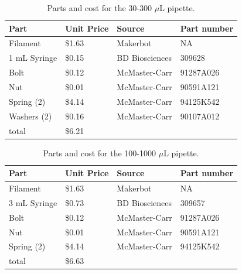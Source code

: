 \documentclass[10pt,letterpaper]{article}
\begin{document}
\begin{table}[!ht]
\centering
\caption{Parts and cost for the 30-300 $\mu$L pipette.}
\label{table1}
\begin{tabular}{|l|l|l|l|}
	\hline
	Part         & Unit Price & Source         & Part number \\ \hline
	Filament     & \$1.63     & Makerbot       & NA          \\ \hline
	1 mL Syringe & \$0.15     & BD Biosciences & 309628      \\ \hline
	Bolt         & \$0.12     & McMaster-Carr  & 91287A026   \\ \hline
	Nut          & \$0.01     & McMaster-Carr  & 90591A121   \\ \hline
	Spring (2)   & \$4.14     & McMaster-Carr  & 94125K542   \\ \hline
	Washers (2)  & \$0.16     & McMaster-Carr  & 90107A012   \\ \hline
	total        & \$6.21     &                &             \\ \hline
\end{tabular}
\end{table}

\begin{table}[!ht]
\centering
\caption{Parts and cost for the 100-1000 $\mu$L pipette.}
\label{table2}
\begin{tabular}{|l|l|l|l|}
	\hline
	Part         & Unit Price & Source         & Part number \\ \hline
	Filament     & \$1.63     & Makerbot       & NA          \\ \hline
	3 mL Syringe & \$0.73     & BD Biosciences & 309657      \\ \hline
	Bolt         & \$0.12     & McMaster-Carr  & 91287A026   \\ \hline
	Nut          & \$0.01     & McMaster-Carr  & 90591A121   \\ \hline
	Spring (2)   & \$4.14     & McMaster-Carr  & 94125K542   \\ \hline
	total        & \$6.63     &                &             \\ \hline
\end{tabular}
\end{table}
\end{document}
